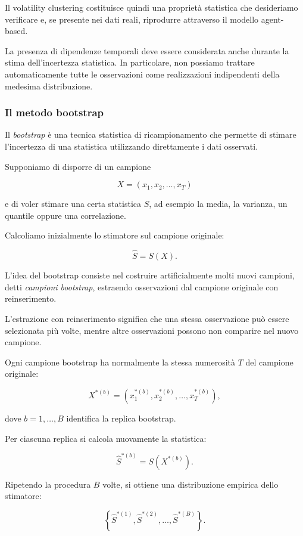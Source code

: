 Il volatility clustering costituisce quindi una proprietà statistica che
desideriamo verificare e, se presente nei dati reali, riprodurre attraverso
il modello agent-based.

La presenza di dipendenze temporali deve essere considerata anche durante
la stima dell'incertezza statistica. In particolare, non possiamo trattare
automaticamente tutte le osservazioni come realizzazioni indipendenti
della medesima distribuzione.

\subsubsection{Il metodo bootstrap}

Il \textit{bootstrap} è una tecnica statistica di ricampionamento che permette
di stimare l'incertezza di una statistica utilizzando direttamente i dati
osservati.

Supponiamo di disporre di un campione

\[
X=(x_1,x_2,\ldots,x_T)
\]

e di voler stimare una certa statistica $S$, ad esempio la media,
la varianza, un quantile oppure una correlazione.

Calcoliamo inizialmente lo stimatore sul campione originale:

\[
\widehat{S}=S(X).
\]

L'idea del bootstrap consiste nel costruire artificialmente molti nuovi
campioni, detti \textit{campioni bootstrap}, estraendo osservazioni dal
campione originale con reinserimento.

L'estrazione con reinserimento significa che una stessa osservazione può
essere selezionata più volte, mentre altre osservazioni possono non comparire
nel nuovo campione.

Ogni campione bootstrap ha normalmente la stessa numerosità $T$ del campione
originale:

\[
X^{*(b)}
=
(x_1^{*(b)},x_2^{*(b)},\ldots,x_T^{*(b)}),
\]

dove $b=1,\ldots,B$ identifica la replica bootstrap.

Per ciascuna replica si calcola nuovamente la statistica:

\[
\widehat{S}^{*(b)}=S(X^{*(b)}).
\]

Ripetendo la procedura $B$ volte, si ottiene una distribuzione empirica
dello stimatore:

\[
\left\{
\widehat{S}^{*(1)},
\widehat{S}^{*(2)},
\ldots,
\widehat{S}^{*(B)}
\right\}.
\]

